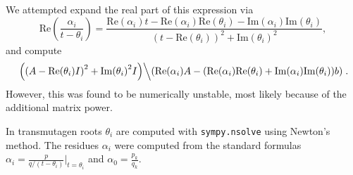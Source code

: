 We attempted expand the real part of this expression via
\begin{equation}
\mathrm{Re}\left(\frac{\alpha_i}{t - \theta_i}\right) = \frac{\mathrm{Re}{(\alpha_{i})}t - \mathrm{Re}{(\alpha_{i})} \mathrm{Re}{(\theta_{i})} - \mathrm{Im}{(\alpha_{i})} \mathrm{Im}{(\theta_{i})}}{\left(t - \mathrm{Re}{(\theta_{i})}\right)^{2} + \mathrm{Im}{(\theta_{i})}^{2}},
\end{equation}
and compute
\begin{equation}
  \left.\left(\left(A - \mathrm{Re}{(\theta_{i})I}\right)^{2} +
  \mathrm{Im}{(\theta_{i})}^{2}I\right)\middle\backslash \left(\mathrm{Re}{(\alpha_{i})}A - (\mathrm{Re}{(\alpha_{i})} \mathrm{Re}{(\theta_{i})} + \mathrm{Im}{(\alpha_{i})} \mathrm{Im}{(\theta_{i})})b\right)\right..
\end{equation}
However, this was found to be numerically unstable, most likely because of the
additional matrix power. %

In transmutagen roots $\theta_i$ are computed with
\texttt{sympy.\allowbreak{}nsolve} using Newton's method.  The residues
$\alpha_i$ were computed from the standard formulas
$\alpha_i = \frac{p}{q/(t - \theta_i)}|_{t=\theta_i}$ and
$\alpha_0=\frac{p_k}{q_k}$.
